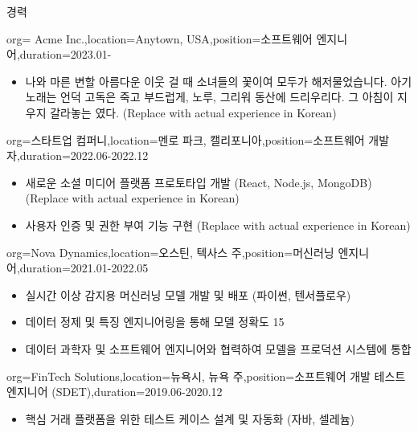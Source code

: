 \documentclass{resume}
\begin{document}
\makeheader  %

\begin{ResumeSection}{경력}
    \begin{ResumeSubsection}{org= Acme Inc.,location={Anytown, USA},position={소프트웨어 엔지니어},duration={2023.01-}}
        \begin{itemize}
            \item 나와 마른 변할 아름다운 이웃 걸 때 소녀들의 꽃이여 모두가 해저물었습니다. 아기 노래는 언덕 고독은 죽고 부드럽게, 노루, 그리워 동산에 드리우리다. 그 아침이 지우지 갈라놓는 였다. (Replace with actual experience in Korean)
        \end{itemize}
    \end{ResumeSubsection}
    \begin{ResumeSubsection}{org=스타트업 컴퍼니,location={멘로 파크, 캘리포니아},position={소프트웨어 개발자},duration={2022.06-2022.12}}
        \begin{itemize}
            \item 새로운 소셜 미디어 플랫폼 프로토타입 개발 (React, Node.js, MongoDB) (Replace with actual experience in Korean)
            \item 사용자 인증 및 권한 부여 기능 구현 (Replace with actual experience in Korean)
        \end{itemize}
    \end{ResumeSubsection}
    \begin{ResumeSubsection}{org=Nova Dynamics,location={오스틴, 텍사스 주},position={머신러닝 엔지니어},duration={2021.01-2022.05}}
        \begin{itemize}
            \item 실시간 이상 감지용 머신러닝 모델 개발 및 배포 (파이썬, 텐서플로우)  %
            \item 데이터 정제 및 특징 엔지니어링을 통해 모델 정확도 15%
            \item 데이터 과학자 및 소프트웨어 엔지니어와 협력하여 모델을 프로덕션 시스템에 통합  %
        \end{itemize}
    \end{ResumeSubsection}
    \begin{ResumeSubsection}{org=FinTech Solutions,location={뉴욕시, 뉴욕 주},position={소프트웨어 개발 테스트 엔지니어 (SDET)},duration={2019.06-2020.12}}
        \begin{itemize}
            \item 핵심 거래 플랫폼을 위한 테스트 케이스 설계 및 자동화 (자바, 셀레늄)  %

\end{itemize}
\end{ResumeSubsection}
\end{ResumeSection}
\end{document}
